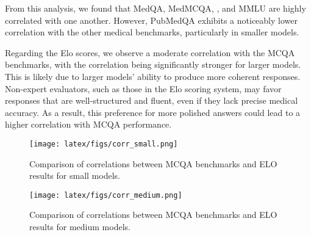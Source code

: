 From this analysis, we found that MedQA, MedMCQA, \careqa{}, and MMLU are highly correlated with one another. However, PubMedQA exhibits a noticeably lower correlation with the other medical benchmarks, particularly in smaller models.


Regarding the Elo scores, we observe a moderate correlation with the MCQA benchmarks, with the correlation being significantly stronger for larger models. This is likely due to larger models' ability to produce more coherent responses. Non-expert evaluators, such as those in the Elo scoring system, may favor responses that are well-structured and fluent, even if they lack precise medical accuracy. As a result, this preference for more polished answers could lead to a higher correlation with MCQA performance.







    \begin{figure}[t]
        \centering
        \texttt{[image: latex/figs/corr\_small.png]}
        \caption{Comparison of correlations between MCQA benchmarks and ELO results for small models.}
        \label{fig:corr_small}
    \end{figure}
    \hfill
    
\begin{figure}[h] %
        \centering

        \texttt{[image: latex/figs/corr\_medium.png]}
        \caption{Comparison of correlations between MCQA benchmarks and ELO results for medium models.}
        \label{fig:corr_medium}
\end{figure}

\begin{comment}
    
\begin{figure*}[b]
    \centering
    \begin{subfigure}[b]{0.47\textwidth} %
        \centering
        \texttt{[image: latex/figs/corr\_small.png]}
        \caption{Correlations for small models.}
        \label{fig:corr_small}
    \end{subfigure}
    \hfill
    \begin{subfigure}[b]{0.47\textwidth} %
        \centering
        \texttt{[image: latex/figs/corr\_medium.png]}
        \caption{Correlations for medium models.}
        \label{fig:corr_medium}
    \end{subfigure}
    \caption{Comparison of correlations between MCQA benchmarks and ELO results for small and medium models.}
    \label{fig:correlation_comparison}
\end{figure*}
\end{comment}



